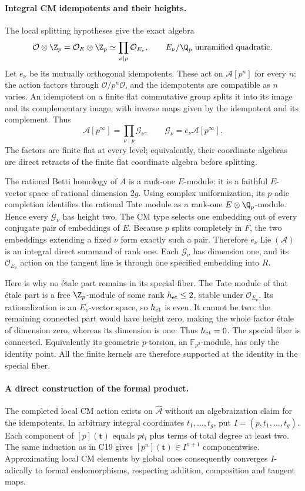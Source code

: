 \paragraph{Integral CM idempotents and their heights.}
The local splitting hypotheses give the exact algebra
\[
 \mathcal O\otimes\Z_p
       =\mathcal O_E\otimes\Z_p
       \simeq\prod_{\nu\mid p}\mathcal O_{E_\nu},
 \qquad E_\nu/\Q_p\text{ unramified quadratic}.
\]
Let $e_\nu$ be its mutually orthogonal idempotents.
These act on $\mathcal A[p^n]$ for every $n$: the action
factors through $\mathcal O/p^n\mathcal O$, and the
idempotents are compatible as $n$ varies.
An idempotent on a finite flat commutative group splits it
into its image and its complementary image, with inverse
maps given by the idempotent and its complement.
Thus
\[
 \mathcal A[p^\infty]=\prod_{\nu\mid p}\mathcal G_\nu,
       \qquad \mathcal G_\nu=e_\nu\mathcal A[p^\infty].
\]
The factors are finite flat at every level; equivalently,
their coordinate algebras are direct retracts of the finite
flat coordinate algebra before splitting.

The rational Betti homology of $A$ is a rank-one $E$-module:
it is a faithful $E$-vector space of rational dimension $2g$.
Using complex uniformization, its $p$-adic completion identifies
the rational Tate module as a rank-one
$E\otimes\Q_p$-module.  Hence every $\mathcal G_\nu$
has height two.
The CM type selects one embedding out of every conjugate
pair of embeddings of $E$.  Because $p$ splits completely
in $F$, the two embeddings extending a fixed $\nu$ form
exactly such a pair.  Therefore
$e_\nu\operatorname{Lie}(\mathcal A)$ is an integral direct
summand of rank one.  Each $\mathcal G_\nu$ has dimension
one, and its $\mathcal O_{E_\nu}$ action on the tangent
line is through one specified embedding into $R$.

Here is why no \'etale part remains in its special fiber.
The Tate module of that \'etale part is a free $\Z_p$-module
of some rank $h_{\rm et}\leq2$, stable under
$\mathcal O_{E_\nu}$.  Its rationalization is an
$E_\nu$-vector space, so $h_{\rm et}$ is even.
It cannot be two: the remaining connected part would have
height zero, making the whole factor \'etale of dimension
zero, whereas its dimension is one.  Thus $h_{\rm et}=0$.
The special fiber is connected.  Equivalently its geometric
$p$-torsion, an $\mathbb F_{p^2}$-module, has only the
identity point.  All the finite kernels are therefore supported
at the identity in the special fiber.

\paragraph{A direct construction of the formal product.}
The completed local CM action exists on
$\widehat{\mathcal A}$ without an algebraization claim for
the idempotents.  In arbitrary integral coordinates
$t_1,\ldots,t_g$, put $I=(p,t_1,\ldots,t_g)$.
Each component of $[p](\mathbf t)$ equals $pt_i$ plus
terms of total degree at least two.  The same induction as
in C19 gives $[p^n](\mathbf t)\in I^{n+1}$ componentwise.
Approximating local CM elements by global ones consequently
converges $I$-adically to formal endomorphisms, respecting
addition, composition and tangent maps.


